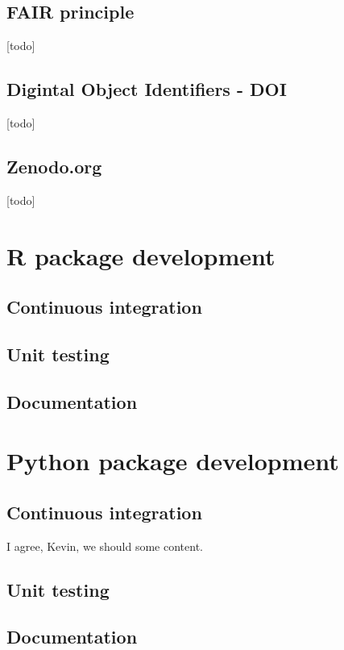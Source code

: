 \documentclass[]{book}
\begin{document}
\section{FAIR principle}\label{sct-fair}

{[}todo{]}

\section{Digintal Object Identifiers - DOI}\label{sct-doi}

{[}todo{]}

\section{Zenodo.org}\label{sct-zenodo}

{[}todo{]}

\chapter{R package development}\label{r-package-development}

\section{Continuous integration}\label{continuous-integration}

\section{Unit testing}\label{unit-testing}

\section{Documentation}\label{documentation}

\chapter{Python package development}\label{python-package-development}

\section{Continuous integration}\label{continuous-integration-1}

I agree, Kevin, we should some content.

\section{Unit testing}\label{unit-testing-1}

\section{Documentation}\label{documentation-1}


\end{document}
